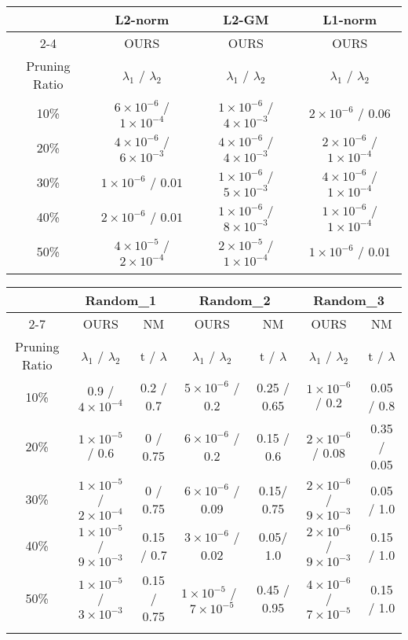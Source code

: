 \begin{table*}[h]
\centering 
\scriptsize
\begin{tabular}{c|c|c|c}\Xhline{2\arrayrulewidth}
\multirow{2}{*}{Criterion} & L2-norm& L2-GM & L1-norm\\ \cline{2-4} 
& OURS& OURS& OURS\\ \hline
Pruning Ratio& $\lambda_1$ / $\lambda_2$  & $\lambda_1$ / $\lambda_2$  & $\lambda_1$ / $\lambda_2$  \\\Xhline{2\arrayrulewidth}
10\%  & $6\times10^{-6}$ / $1\times10^{-4}$ & $1\times10^{-6}$ / $4\times10^{-3}$ & $2\times10^{-6}$ / $0.06$  \\ \hline
20\%  & $4\times10^{-6}$ / $6\times10^{-3}$ & $4\times10^{-6}$ / $4\times10^{-3}$ & $2\times10^{-6}$ / $1\times10^{-4}$ \\ \hline
30\%  & $1\times10^{-6}$ / $0.01$           & $1\times10^{-6}$ / $5\times10^{-3}$ & $4\times10^{-6}$ / $1\times10^{-4}$ \\ \hline
40\%  & $2\times10^{-6}$ / $0.01$           & $1\times10^{-6}$ / $8\times10^{-3}$ & $1\times10^{-6}$ / $1\times10^{-4}$ \\ \hline
50\%  & $4\times10^{-5}$ / $2\times10^{-4}$ & $2\times10^{-5}$ / $1\times10^{-4}$ & $1\times10^{-6}$ / $0.01$  \\ \Xhline{2\arrayrulewidth}
\end{tabular}%
\vspace{4mm}
\begin{tabular}{c|c|c|c|c|c|c}\Xhline{2\arrayrulewidth}
\multirow{2}{*}{Criterion} & \multicolumn{2}{c|}{Random\_1}& \multicolumn{2}{c|}{Random\_2}& \multicolumn{2}{c}{Random\_3}\\ \cline{2-7} 
    & OURS& NM& OURS& NM& OURS& NM\\ \hline
Pruning Ratio& $\lambda_1$ / $\lambda_2$ & t / $\lambda$ & $\lambda_1$ / $\lambda_2$ & t / $\lambda$ & $\lambda_1$ / $\lambda_2$ & t / $\lambda$ \\ \Xhline{2\arrayrulewidth}
10\%& 0.9 / $4\times10^{-4}$& 0.2 / 0.7   & $5\times10^{-6}$ / 0.2& 0.25 / 0.65     & $1\times10^{-6}$ / 0.2  & 0.05 / 0.8\\ \hline
20\%& $1\times10^{-5}$ / 0.6& 0 / 0.75    & $6\times10^{-6}$ / 0.2& 0.15 / 0.6& $2\times10^{-6}$ / 0.08 & 0.35 / 0.05 \\ \hline
30\%& $1\times10^{-5}$ / $2\times10^{-4}$ & 0 / 0.75    & $6\times10^{-6}$ / 0.09& 0.15/ 0.75& $2\times10^{-6}$ / $9\times10^{-3}$   & 0.05 / 1.0  \\ \hline
40\%& $1\times10^{-5}$ / $9\times10^{-3}$ & 0.15 / 0.7  & $3\times10^{-6}$ / 0.02& 0.05/ 1.0 & $2\times10^{-6}$ / $9\times10^{-3}$   & 0.15 / 1.0  \\ \hline
50\%& $1\times10^{-5}$ / $3\times10^{-3}$ & 0.15 / 0.75 & $1\times10^{-5}$ /~$7\times10^{-5}$ & 0.45 / 0.95     & $4\times10^{-6}$ / $7\times10^{-5}$   & 0.15 / 1.0  \\ \Xhline{2\arrayrulewidth}
\end{tabular}%
\caption{hyperparameters of VGG16 on CIFAR-10}
\label{tab:param:vgg16:cifar10}
\vspace{4mm}
\end{table*}
